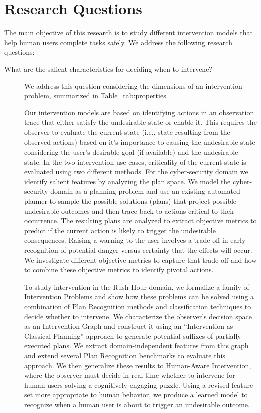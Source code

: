 \section{Research Questions}
The main objective of this research is to study different intervention models that help human users complete tasks safely. We address the following research questions: 
\begin{description}
\item[What are the salient characteristics for deciding when to intervene?]
We address this question considering the dimensions of an intervention problem, summarized in Table~\ref{tab:properties}.

Our intervention models are based on identifying actions in an observation trace that either satisfy the undesirable state or enable it. 
This requires the observer to evaluate the current state (i.e., state resulting from the observed actions) based on it's importance to causing the undesirable state considering the user's desirable goal (if available) and the undesirable state.
In the two intervention use cases, criticality of the current state is evaluated using two different methods. 
For the cyber-security domain we identify salient features by analyzing the plan space. 
We model the cyber-security domain as a planning problem and use an existing automated planner to  sample the possible solutions (plans) that project possible undesirable outcomes and then trace back to actions critical to their occurrence. 
The resulting plans are analyzed to extract objective metrics to predict if the current action is likely to trigger the undesirable consequences. 
Raising a warning to the user involves a trade-off in early recognition of potential danger versus certainty that the effects will occur. 
We investigate different objective metrics to capture that trade-off and how to combine these objective metrics to identify pivotal actions. 

To study intervention in the Rush Hour domain, we formalize a family of Intervention Problems and show how these problems can be solved using a combination of Plan Recognition methods and classification techniques to decide whether to intervene. 
We characterize the observer's decision space as an Intervention Graph and construct it using an ``Intervention as Classical Planning'' approach to generate potential suffixes of partially executed plans. 
We extract domain-independent features from this graph and extend several Plan Recognition benchmarks to evaluate this approach. 
We then generalize these results to Human-Aware Intervention, where the observer must decide in
real time whether to intervene for human users solving a cognitively engaging puzzle. 
Using a revised feature set more appropriate to human behavior, we produce a learned model to recognize when a human user is about to trigger an undesirable outcome.


\end{description}
